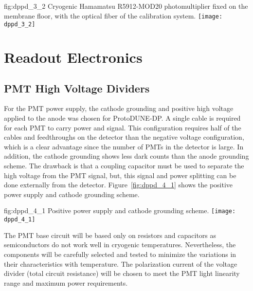 \begin{dunefigure}{fig:dppd_3_2}
{Cryogenic Hamamatsu R5912-MOD20 photomultiplier fixed on the membrane floor, with the optical fiber of the calibration system.}
\texttt{[image: dppd\_3\_2]}
\end{dunefigure}

\section{Readout Electronics}
\label{sec:fddp-pd-4}

\subsection{PMT High Voltage Dividers}
\label{sec:fddp-pd-4.1}

For the PMT power supply, the cathode grounding and positive high voltage applied to the anode was chosen for ProtoDUNE-DP. A single cable is required for each PMT to carry power and signal. This configuration requires half of the cables and feedthroughs on the detector than the negative voltage configuration, which is a clear advantage since the number of PMTs in the detector is large. In addition, the cathode grounding shows less dark counts than the anode grounding scheme. The drawback is that a coupling capacitor must be used to separate the high voltage from the PMT signal, but, this signal and power splitting can be done externally from the detector. Figure~\ref{fig:dppd_4_1} shows the positive power supply and cathode grounding scheme.

\begin{dunefigure}{fig:dppd_4_1}
{Positive power supply and cathode grounding scheme.}
\texttt{[image: dppd\_4\_1]}
\end{dunefigure}

The PMT base circuit will be based only on resistors and capacitors as semiconductors do not work well in cryogenic temperatures. Nevertheless, the components will be carefully selected and tested to minimize the variations in their characteristics with temperature. The polarization current of the voltage divider (total circuit resistance) will be chosen to meet the PMT light linearity range and maximum power requirements.

